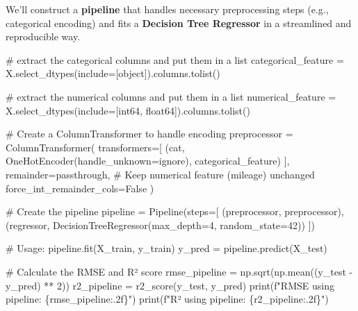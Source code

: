 \documentclass[
  letterpaper,
  DIV=11,
  numbers=noendperiod]{scrreprt}
\newenvironment{Shaded}{\begin{snugshade}}{\end{snugshade}}
\newcommand{\BuiltInTok}[1]{\textcolor[rgb]{0.00,0.23,0.31}{#1}}
\newcommand{\CommentTok}[1]{\textcolor[rgb]{0.37,0.37,0.37}{#1}}
\newcommand{\DecValTok}[1]{\textcolor[rgb]{0.68,0.00,0.00}{#1}}
\newcommand{\NormalTok}[1]{\textcolor[rgb]{0.00,0.23,0.31}{#1}}
\newcommand{\OperatorTok}[1]{\textcolor[rgb]{0.37,0.37,0.37}{#1}}
\newcommand{\SpecialCharTok}[1]{\textcolor[rgb]{0.37,0.37,0.37}{#1}}
\newcommand{\SpecialStringTok}[1]{\textcolor[rgb]{0.13,0.47,0.30}{#1}}
\newcommand{\StringTok}[1]{\textcolor[rgb]{0.13,0.47,0.30}{#1}}
\newcommand{\VariableTok}[1]{\textcolor[rgb]{0.07,0.07,0.07}{#1}}
\begin{document}
We'll construct a \textbf{pipeline} that handles necessary preprocessing
steps (e.g., categorical encoding) and fits a \textbf{Decision Tree
Regressor} in a streamlined and reproducible way.

\begin{Shaded}
\begin{Highlighting}[]
\CommentTok{\# extract the categorical columns and put them in a list}
\NormalTok{categorical\_feature }\OperatorTok{=}\NormalTok{ X.select\_dtypes(include}\OperatorTok{=}\NormalTok{[}\StringTok{\textquotesingle{}object\textquotesingle{}}\NormalTok{]).columns.tolist()}

\CommentTok{\# extract the numerical columns and put them in a list}
\NormalTok{numerical\_feature }\OperatorTok{=}\NormalTok{ X.select\_dtypes(include}\OperatorTok{=}\NormalTok{[}\StringTok{\textquotesingle{}int64\textquotesingle{}}\NormalTok{, }\StringTok{\textquotesingle{}float64\textquotesingle{}}\NormalTok{]).columns.tolist()}


\CommentTok{\# Create a ColumnTransformer to handle encoding}
\NormalTok{preprocessor }\OperatorTok{=}\NormalTok{ ColumnTransformer(}
\NormalTok{    transformers}\OperatorTok{=}\NormalTok{[}
\NormalTok{        (}\StringTok{\textquotesingle{}cat\textquotesingle{}}\NormalTok{, OneHotEncoder(handle\_unknown}\OperatorTok{=}\StringTok{\textquotesingle{}ignore\textquotesingle{}}\NormalTok{), categorical\_feature)}
\NormalTok{    ],}
\NormalTok{    remainder}\OperatorTok{=}\StringTok{\textquotesingle{}passthrough\textquotesingle{}}\NormalTok{,  }\CommentTok{\# Keep numerical feature (mileage) unchanged}
\NormalTok{    force\_int\_remainder\_cols}\OperatorTok{=}\VariableTok{False}
\NormalTok{)}

\CommentTok{\# Create the pipeline}
\NormalTok{pipeline }\OperatorTok{=}\NormalTok{ Pipeline(steps}\OperatorTok{=}\NormalTok{[}
\NormalTok{    (}\StringTok{\textquotesingle{}preprocessor\textquotesingle{}}\NormalTok{, preprocessor),}
\NormalTok{    (}\StringTok{\textquotesingle{}regressor\textquotesingle{}}\NormalTok{, DecisionTreeRegressor(max\_depth}\OperatorTok{=}\DecValTok{4}\NormalTok{, random\_state}\OperatorTok{=}\DecValTok{42}\NormalTok{))}
\NormalTok{])}

\CommentTok{\# Usage:}
\NormalTok{pipeline.fit(X\_train, y\_train)}
\NormalTok{y\_pred }\OperatorTok{=}\NormalTok{ pipeline.predict(X\_test)}

\CommentTok{\# Calculate the RMSE and R² score}
\NormalTok{rmse\_pipeline }\OperatorTok{=}\NormalTok{ np.sqrt(np.mean((y\_test }\OperatorTok{{-}}\NormalTok{ y\_pred) }\OperatorTok{**} \DecValTok{2}\NormalTok{))}
\NormalTok{r2\_pipeline }\OperatorTok{=}\NormalTok{ r2\_score(y\_test, y\_pred)}
\BuiltInTok{print}\NormalTok{(}\SpecialStringTok{f"RMSE using pipeline: }\SpecialCharTok{\{}\NormalTok{rmse\_pipeline}\SpecialCharTok{:.2f\}}\SpecialStringTok{"}\NormalTok{)}
\BuiltInTok{print}\NormalTok{(}\SpecialStringTok{f"R² using pipeline: }\SpecialCharTok{\{}\NormalTok{r2\_pipeline}\SpecialCharTok{:.2f\}}\SpecialStringTok{"}\NormalTok{)}
\end{Highlighting}
\end{Shaded}
\end{document}
